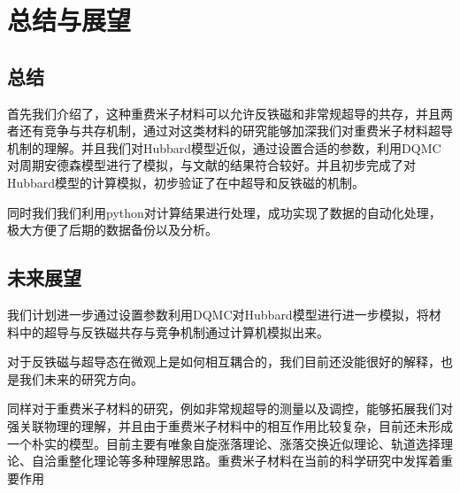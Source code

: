 
\section{总结与展望}
\subsection{总结}
首先我们介绍了，这种重费米子材料可以允许反铁磁和非常规超导的共存，并且两者还有竞争与共存机制，通过对这类材料的研究能够加深我们对重费米子材料超导机制的理解。并且我们对Hubbard模型近似，通过设置合适的参数，利用DQMC对周期安德森模型进行了模拟，与文献的结果符合较好。并且初步完成了对Hubbard模型的计算模拟，初步验证了在中超导和反铁磁的机制。

同时我们我们利用python对计算结果进行处理，成功实现了数据的自动化处理，极大方便了后期的数据备份以及分析。

\subsection{未来展望}
我们计划进一步通过设置参数利用DQMC对Hubbard模型进行进一步模拟，将材料中的超导与反铁磁共存与竞争机制通过计算机模拟出来。

对于反铁磁与超导态在微观上是如何相互耦合的，我们目前还没能很好的解释，也是我们未来的研究方向。

同样对于重费米子材料的研究，例如非常规超导的测量以及调控，能够拓展我们对强关联物理的理解，并且由于重费米子材料中的相互作用比较复杂，目前还未形成一个朴实的模型。目前主要有唯象自旋涨落理论、涨落交换近似理论、轨道选择理论、自洽重整化理论等多种理解思路。重费米子材料在当前的科学研究中发挥着重要作用
